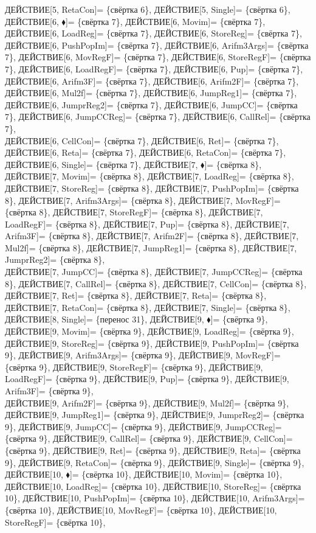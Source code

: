 \documentclass[a0]{a0poster}
\begin{document}
ДЕЙСТВИЕ[5, RetaCon]= \{свёртка 6\}, ДЕЙСТВИЕ[5, Single]= \{свёртка 6\}, ДЕЙСТВИЕ[6, $\blacklozenge$]= \{свёртка 7\}, ДЕЙСТВИЕ[6, Movim]= \{свёртка 7\}, ДЕЙСТВИЕ[6, LoadReg]= \{свёртка 7\}, ДЕЙСТВИЕ[6, StoreReg]= \{свёртка 7\}, ДЕЙСТВИЕ[6, PushPopIm]= \{свёртка 7\}, ДЕЙСТВИЕ[6, Arifm3Args]= \{свёртка 7\}, ДЕЙСТВИЕ[6, MovRegF]= \{свёртка 7\}, ДЕЙСТВИЕ[6, StoreRegF]= \{свёртка 7\}, ДЕЙСТВИЕ[6, LoadRegF]= \{свёртка 7\}, ДЕЙСТВИЕ[6, Pup]= \{свёртка 7\}, ДЕЙСТВИЕ[6, Arifm3F]= \{свёртка 7\}, ДЕЙСТВИЕ[6, Arifm2F]= \{свёртка 7\}, ДЕЙСТВИЕ[6, Mul2f]= \{свёртка 7\}, ДЕЙСТВИЕ[6, JumpReg1]= \{свёртка 7\}, ДЕЙСТВИЕ[6, JumprReg2]= \{свёртка 7\}, ДЕЙСТВИЕ[6, JumpCC]= \{свёртка 7\}, ДЕЙСТВИЕ[6, JumpCCReg]= \{свёртка 7\}, ДЕЙСТВИЕ[6, CallRel]= \{свёртка 7\}, \\
ДЕЙСТВИЕ[6, CellCon]= \{свёртка 7\}, ДЕЙСТВИЕ[6, Ret]= \{свёртка 7\}, ДЕЙСТВИЕ[6, Reta]= \{свёртка 7\}, ДЕЙСТВИЕ[6, RetaCon]= \{свёртка 7\}, ДЕЙСТВИЕ[6, Single]= \{свёртка 7\}, ДЕЙСТВИЕ[7, $\blacklozenge$]= \{свёртка 8\}, ДЕЙСТВИЕ[7, Movim]= \{свёртка 8\}, ДЕЙСТВИЕ[7, LoadReg]= \{свёртка 8\}, ДЕЙСТВИЕ[7, StoreReg]= \{свёртка 8\}, ДЕЙСТВИЕ[7, PushPopIm]= \{свёртка 8\}, ДЕЙСТВИЕ[7, Arifm3Args]= \{свёртка 8\}, ДЕЙСТВИЕ[7, MovRegF]= \{свёртка 8\}, ДЕЙСТВИЕ[7, StoreRegF]= \{свёртка 8\}, ДЕЙСТВИЕ[7, LoadRegF]= \{свёртка 8\}, ДЕЙСТВИЕ[7, Pup]= \{свёртка 8\}, ДЕЙСТВИЕ[7, Arifm3F]= \{свёртка 8\}, ДЕЙСТВИЕ[7, Arifm2F]= \{свёртка 8\}, ДЕЙСТВИЕ[7, Mul2f]= \{свёртка 8\}, ДЕЙСТВИЕ[7, JumpReg1]= \{свёртка 8\}, ДЕЙСТВИЕ[7, JumprReg2]= \{свёртка 8\}, \\
ДЕЙСТВИЕ[7, JumpCC]= \{свёртка 8\}, ДЕЙСТВИЕ[7, JumpCCReg]= \{свёртка 8\}, ДЕЙСТВИЕ[7, CallRel]= \{свёртка 8\}, ДЕЙСТВИЕ[7, CellCon]= \{свёртка 8\}, ДЕЙСТВИЕ[7, Ret]= \{свёртка 8\}, ДЕЙСТВИЕ[7, Reta]= \{свёртка 8\}, ДЕЙСТВИЕ[7, RetaCon]= \{свёртка 8\}, ДЕЙСТВИЕ[7, Single]= \{свёртка 8\}, ДЕЙСТВИЕ[8, Single]= \{перенос 31\}, ДЕЙСТВИЕ[9, $\blacklozenge$]= \{свёртка 9\}, ДЕЙСТВИЕ[9, Movim]= \{свёртка 9\}, ДЕЙСТВИЕ[9, LoadReg]= \{свёртка 9\}, ДЕЙСТВИЕ[9, StoreReg]= \{свёртка 9\}, ДЕЙСТВИЕ[9, PushPopIm]= \{свёртка 9\}, ДЕЙСТВИЕ[9, Arifm3Args]= \{свёртка 9\}, ДЕЙСТВИЕ[9, MovRegF]= \{свёртка 9\}, ДЕЙСТВИЕ[9, StoreRegF]= \{свёртка 9\}, ДЕЙСТВИЕ[9, LoadRegF]= \{свёртка 9\}, ДЕЙСТВИЕ[9, Pup]= \{свёртка 9\}, ДЕЙСТВИЕ[9, Arifm3F]= \{свёртка 9\}, \\
ДЕЙСТВИЕ[9, Arifm2F]= \{свёртка 9\}, ДЕЙСТВИЕ[9, Mul2f]= \{свёртка 9\}, ДЕЙСТВИЕ[9, JumpReg1]= \{свёртка 9\}, ДЕЙСТВИЕ[9, JumprReg2]= \{свёртка 9\}, ДЕЙСТВИЕ[9, JumpCC]= \{свёртка 9\}, ДЕЙСТВИЕ[9, JumpCCReg]= \{свёртка 9\}, ДЕЙСТВИЕ[9, CallRel]= \{свёртка 9\}, ДЕЙСТВИЕ[9, CellCon]= \{свёртка 9\}, ДЕЙСТВИЕ[9, Ret]= \{свёртка 9\}, ДЕЙСТВИЕ[9, Reta]= \{свёртка 9\}, ДЕЙСТВИЕ[9, RetaCon]= \{свёртка 9\}, ДЕЙСТВИЕ[9, Single]= \{свёртка 9\}, ДЕЙСТВИЕ[10, $\blacklozenge$]= \{свёртка 10\}, ДЕЙСТВИЕ[10, Movim]= \{свёртка 10\}, ДЕЙСТВИЕ[10, LoadReg]= \{свёртка 10\}, ДЕЙСТВИЕ[10, StoreReg]= \{свёртка 10\}, ДЕЙСТВИЕ[10, PushPopIm]= \{свёртка 10\}, ДЕЙСТВИЕ[10, Arifm3Args]= \{свёртка 10\}, ДЕЙСТВИЕ[10, MovRegF]= \{свёртка 10\}, ДЕЙСТВИЕ[10, StoreRegF]= \{свёртка 10\}, \\
\end{document}
